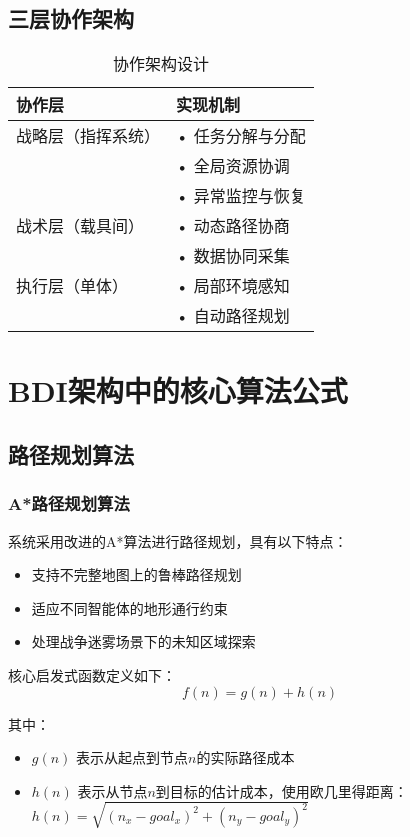\documentclass[12pt,a4paper]{article}
\begin{document}
\subsection{三层协作架构}

\begin{table}[h]
\centering
\caption{协作架构设计}
\begin{tabular}{|>{\centering\arraybackslash}p{4cm}|>{\raggedright\arraybackslash}p{9cm}|}
\hline
\textbf{协作层} & \textbf{实现机制} \\
\hline
\rowcolor{lightgray}
战略层（指挥系统） & • 任务分解与分配\\
& • 全局资源协调\\
& • 异常监控与恢复\\
\hline
战术层（载具间） & • 动态路径协商\\
& • 数据协同采集\\
\hline
\rowcolor{lightgray}
执行层（单体） & • 局部环境感知\\
& • 自动路径规划\\
\hline
\end{tabular}
\end{table}




\section{BDI架构中的核心算法公式}

\subsection{路径规划算法}

\subsubsection{A*路径规划算法}
系统采用改进的A*算法进行路径规划，具有以下特点：

\begin{itemize}
\item 支持不完整地图上的鲁棒路径规划
\item 适应不同智能体的地形通行约束 
\item 处理战争迷雾场景下的未知区域探索
\end{itemize}

核心启发式函数定义如下：
\begin{equation}
f(n) = g(n) + h(n)
\end{equation}

其中：
\begin{itemize}
\item $g(n)$ 表示从起点到节点$n$的实际路径成本
\item $h(n)$ 表示从节点$n$到目标的估计成本，使用欧几里得距离：$h(n) = \sqrt{(n_x - goal_x)^2 + (n_y - goal_y)^2}$
\end{itemize}
\end{document}
